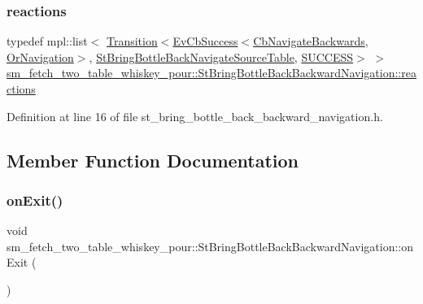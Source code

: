 \subsubsection{\texorpdfstring{reactions}{reactions}}
{\footnotesize\ttfamily typedef mpl\+::list$<$ \hyperlink{classsmacc_1_1Transition}{Transition}$<$\hyperlink{structsmacc_1_1EvCbSuccess}{Ev\+Cb\+Success}$<$\hyperlink{classcl__move__base__z_1_1CbNavigateBackwards}{Cb\+Navigate\+Backwards}, \hyperlink{classsm__fetch__two__table__whiskey__pour_1_1OrNavigation}{Or\+Navigation}$>$, \hyperlink{structsm__fetch__two__table__whiskey__pour_1_1StBringBottleBackNavigateSourceTable}{St\+Bring\+Bottle\+Back\+Navigate\+Source\+Table}, \hyperlink{structsmacc_1_1default__transition__tags_1_1SUCCESS}{S\+U\+C\+C\+E\+SS}$>$ $>$ \hyperlink{structsm__fetch__two__table__whiskey__pour_1_1StBringBottleBackBackwardNavigation_a118215821ee45042294132d540dfbaa0}{sm\+\_\+fetch\+\_\+two\+\_\+table\+\_\+whiskey\+\_\+pour\+::\+St\+Bring\+Bottle\+Back\+Backward\+Navigation\+::reactions}}



Definition at line 16 of file st\+\_\+bring\+\_\+bottle\+\_\+back\+\_\+backward\+\_\+navigation.\+h.



\subsection{Member Function Documentation}
\mbox{\label{structsm__fetch__two__table__whiskey__pour_1_1StBringBottleBackBackwardNavigation_ae595cd281a621fd3d261ef246785ba11}} 
\subsubsection{\texorpdfstring{on\+Exit()}{onExit()}}
{\footnotesize\ttfamily void sm\+\_\+fetch\+\_\+two\+\_\+table\+\_\+whiskey\+\_\+pour\+::\+St\+Bring\+Bottle\+Back\+Backward\+Navigation\+::on\+Exit (\begin{DoxyParamCaption}{ }\end{DoxyParamCaption})\hspace{0.3cm}{\ttfamily [inline]}}



